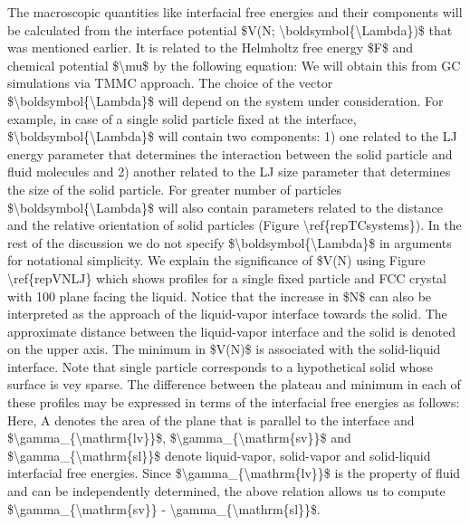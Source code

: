 \par The macroscopic quantities like interfacial free energies and their components will be calculated from the interface potential \$V(N; \textbackslash boldsymbol\{\textbackslash Lambda\})\$ that was mentioned earlier. It is related to the Helmholtz free energy \$F\$ and chemical potential \$\textbackslash mu\$ by the following equation: We will obtain this from GC simulations via TMMC approach. The choice of the vector \$\textbackslash boldsymbol\{\textbackslash Lambda\}\$ will depend on the system under consideration. For example, in case of a single solid particle fixed at the interface, \$\textbackslash boldsymbol\{\textbackslash Lambda\}\$ will contain two components: 1) one related to the LJ energy parameter that determines the interaction between the solid particle and fluid molecules and 2) another related to the LJ size parameter that determines the size of the solid particle. For greater number of particles \$\textbackslash boldsymbol\{\textbackslash Lambda\}\$ will also contain parameters related to the distance and the relative orientation of solid particles (Figure \textbackslash ref\{repTCsystems\}). In the rest of the discussion we do not specify \$\textbackslash boldsymbol\{\textbackslash Lambda\}\$ in arguments for notational simplicity. We explain the significance of \$V(N) using Figure \textbackslash ref\{repVNLJ\} which shows profiles for a single fixed particle and FCC crystal with 100 plane facing the liquid. Notice that the increase in \$N\$ can also be interpreted as the approach of the liquid-vapor interface towards the solid. The approximate distance between the liquid-vapor interface and the solid is denoted on the upper axis. The minimum in \$V(N)\$ is associated with the solid-liquid interface. Note that single particle corresponds to a hypothetical solid whose surface is vey sparse. The difference between the plateau and minimum in each of these profiles may be expressed in terms of the interfacial free energies as follows: Here, A denotes the area of the plane that is parallel to the interface and \$\textbackslash gamma\_\{\textbackslash mathrm\{lv\}\}\$, \$\textbackslash gamma\_\{\textbackslash mathrm\{sv\}\}\$ and \$\textbackslash gamma\_\{\textbackslash mathrm\{sl\}\}\$ denote liquid-vapor, solid-vapor and solid-liquid interfacial free energies. Since \$\textbackslash gamma\_\{\textbackslash mathrm\{lv\}\}\$ is the property of fluid and can be independently determined, the above relation allows us to compute \$\textbackslash gamma\_\{\textbackslash mathrm\{sv\}\} - \textbackslash gamma\_\{\textbackslash mathrm\{sl\}\}\$.
